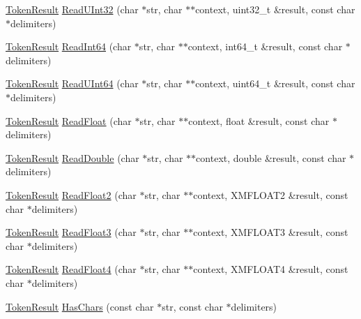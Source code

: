 \begin{DoxyCompactItemize}
\item 
\hyperlink{namespacemage_a2178ba2411db5912f41b2e7698c2037d}{Token\+Result} \hyperlink{namespacemage_aaa46d4e55d14328f2c97ffbcd9167727}{Read\+U\+Int32} (char $\ast$str, char $\ast$$\ast$context, uint32\+\_\+t \&result, const char $\ast$delimiters)
\item 
\hyperlink{namespacemage_a2178ba2411db5912f41b2e7698c2037d}{Token\+Result} \hyperlink{namespacemage_aba0fbc26edf53c3ad92f954adca8e86d}{Read\+Int64} (char $\ast$str, char $\ast$$\ast$context, int64\+\_\+t \&result, const char $\ast$delimiters)
\item 
\hyperlink{namespacemage_a2178ba2411db5912f41b2e7698c2037d}{Token\+Result} \hyperlink{namespacemage_a87be513083fe421ab93f3007538ebef6}{Read\+U\+Int64} (char $\ast$str, char $\ast$$\ast$context, uint64\+\_\+t \&result, const char $\ast$delimiters)
\item 
\hyperlink{namespacemage_a2178ba2411db5912f41b2e7698c2037d}{Token\+Result} \hyperlink{namespacemage_a1856d70d5bbf0c311115f875222a6f1d}{Read\+Float} (char $\ast$str, char $\ast$$\ast$context, float \&result, const char $\ast$delimiters)
\item 
\hyperlink{namespacemage_a2178ba2411db5912f41b2e7698c2037d}{Token\+Result} \hyperlink{namespacemage_a7ea0807bd21210be516463c68be91cb8}{Read\+Double} (char $\ast$str, char $\ast$$\ast$context, double \&result, const char $\ast$delimiters)
\item 
\hyperlink{namespacemage_a2178ba2411db5912f41b2e7698c2037d}{Token\+Result} \hyperlink{namespacemage_a544a1b747b516e80a75a260e902ccf67}{Read\+Float2} (char $\ast$str, char $\ast$$\ast$context, X\+M\+F\+L\+O\+A\+T2 \&result, const char $\ast$delimiters)
\item 
\hyperlink{namespacemage_a2178ba2411db5912f41b2e7698c2037d}{Token\+Result} \hyperlink{namespacemage_a433769b895f3199c55e44b9ff82dd67e}{Read\+Float3} (char $\ast$str, char $\ast$$\ast$context, X\+M\+F\+L\+O\+A\+T3 \&result, const char $\ast$delimiters)
\item 
\hyperlink{namespacemage_a2178ba2411db5912f41b2e7698c2037d}{Token\+Result} \hyperlink{namespacemage_a50641f4da68522a4f74582f428f955d2}{Read\+Float4} (char $\ast$str, char $\ast$$\ast$context, X\+M\+F\+L\+O\+A\+T4 \&result, const char $\ast$delimiters)
\item 
\hyperlink{namespacemage_a2178ba2411db5912f41b2e7698c2037d}{Token\+Result} \hyperlink{namespacemage_a0b670c167bd464cfcb96ff4238e12f76}{Has\+Chars} (const char $\ast$str, const char $\ast$delimiters)
\item 

\end{DoxyCompactItemize}
